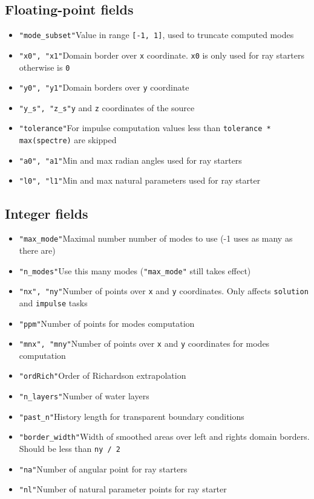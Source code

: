 \documentclass[12pt]{extarticle}
\newcommand{\code}[1]{\colorbox{gray!10}{\texttt{#1}}}
\begin{document}
        \subsection{Floating-point fields}
            \begin{itemize}
                \item\code{"mode_subset"}\qquad Value in range \code{[-1, 1]}, used to truncate computed modes
                \item\code{"x0", "x1"}\qquad Domain border over \code{x} coordinate. \code{x0} is only used for ray starters otherwise is \code{0}
                \item\code{"y0", "y1"}\qquad Domain borders over \code{y} coordinate
                \item\code{"y_s", "z_s"}\qquad \code{y} and \code{z} coordinates of the source
                \item\code{"tolerance"}\qquad For impulse computation values less than \code{tolerance * max(spectre)} are skipped
                \item\code{"a0", "a1"}\qquad Min and max radian angles used for ray starters
                \item\code{"l0", "l1"}\qquad Min and max natural parameters used for ray starter
            \end{itemize}
        \subsection{Integer fields}
            \begin{itemize}
                \item\code{"max_mode"}\qquad Maximal number number of modes to use (-1 uses as many as there are)
                \item\code{"n_modes"}\qquad Use this many modes (\code{"max_mode"} still takes effect)
                \item\code{"nx", "ny"}\qquad Number of points over \code{x} and \code{y} coordinates. Only affects \code{solution} and \code{impulse} tasks
                \item\code{"ppm"}\qquad Number of points for modes computation
                \item\code{"mnx", "mny"}\qquad Number of points over \code{x} and \code{y} coordinates for modes computation
                \item\code{"ordRich"}\qquad Order of Richardson extrapolation
                \item\code{"n_layers"}\qquad Number of water layers
                \item\code{"past_n"}\qquad History length for transparent boundary conditions
                \item\code{"border_width"}\qquad Width of smoothed areas over left and rights domain borders. Should be less than \code{ny / 2}
                \item\code{"na"}\qquad Number of angular point for ray starters
                \item\code{"nl"}\qquad Number of natural parameter points for ray starter
            \end{itemize}
\end{document}
